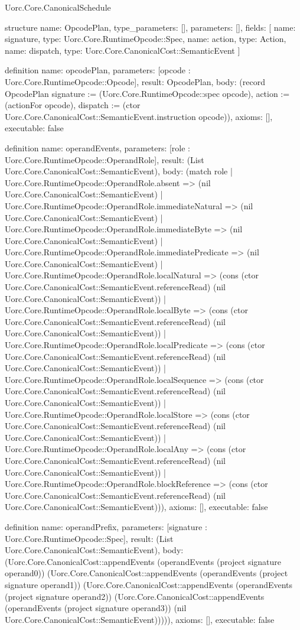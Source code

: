 \begin{lexlean}{Uorc.Core.CanonicalSchedule}
\begin{semanticmodule}
structure{
  name: OpcodePlan,
  type_parameters: [],
  parameters: [],
  fields: [
    {name: signature, type: Uorc.Core.RuntimeOpcode::Spec},
    {name: action, type: Action},
    {name: dispatch, type: Uorc.Core.CanonicalCost::SemanticEvent}
  ]
}

definition{
  name: opcodePlan,
  parameters: [opcode : Uorc.Core.RuntimeOpcode::Opcode],
  result: OpcodePlan,
  body: (record OpcodePlan {signature := (Uorc.Core.RuntimeOpcode::spec opcode), action := (actionFor opcode), dispatch := (ctor Uorc.Core.CanonicalCost::SemanticEvent.instruction opcode)}),
  axioms: [],
  executable: false
}

definition{
  name: operandEvents,
  parameters: [role : Uorc.Core.RuntimeOpcode::OperandRole],
  result: (List Uorc.Core.CanonicalCost::SemanticEvent),
  body: (match role
    | Uorc.Core.RuntimeOpcode::OperandRole.absent => (nil Uorc.Core.CanonicalCost::SemanticEvent)
    | Uorc.Core.RuntimeOpcode::OperandRole.immediateNatural => (nil Uorc.Core.CanonicalCost::SemanticEvent)
    | Uorc.Core.RuntimeOpcode::OperandRole.immediateByte => (nil Uorc.Core.CanonicalCost::SemanticEvent)
    | Uorc.Core.RuntimeOpcode::OperandRole.immediatePredicate => (nil Uorc.Core.CanonicalCost::SemanticEvent)
    | Uorc.Core.RuntimeOpcode::OperandRole.localNatural => (cons (ctor Uorc.Core.CanonicalCost::SemanticEvent.referenceRead) (nil Uorc.Core.CanonicalCost::SemanticEvent))
    | Uorc.Core.RuntimeOpcode::OperandRole.localByte => (cons (ctor Uorc.Core.CanonicalCost::SemanticEvent.referenceRead) (nil Uorc.Core.CanonicalCost::SemanticEvent))
    | Uorc.Core.RuntimeOpcode::OperandRole.localPredicate => (cons (ctor Uorc.Core.CanonicalCost::SemanticEvent.referenceRead) (nil Uorc.Core.CanonicalCost::SemanticEvent))
    | Uorc.Core.RuntimeOpcode::OperandRole.localSequence => (cons (ctor Uorc.Core.CanonicalCost::SemanticEvent.referenceRead) (nil Uorc.Core.CanonicalCost::SemanticEvent))
    | Uorc.Core.RuntimeOpcode::OperandRole.localStore => (cons (ctor Uorc.Core.CanonicalCost::SemanticEvent.referenceRead) (nil Uorc.Core.CanonicalCost::SemanticEvent))
    | Uorc.Core.RuntimeOpcode::OperandRole.localAny => (cons (ctor Uorc.Core.CanonicalCost::SemanticEvent.referenceRead) (nil Uorc.Core.CanonicalCost::SemanticEvent))
    | Uorc.Core.RuntimeOpcode::OperandRole.blockReference => (cons (ctor Uorc.Core.CanonicalCost::SemanticEvent.referenceRead) (nil Uorc.Core.CanonicalCost::SemanticEvent))),
  axioms: [],
  executable: false
}

definition{
  name: operandPrefix,
  parameters: [signature : Uorc.Core.RuntimeOpcode::Spec],
  result: (List Uorc.Core.CanonicalCost::SemanticEvent),
  body: (Uorc.Core.CanonicalCost::appendEvents (operandEvents (project signature operand0)) (Uorc.Core.CanonicalCost::appendEvents (operandEvents (project signature operand1)) (Uorc.Core.CanonicalCost::appendEvents (operandEvents (project signature operand2)) (Uorc.Core.CanonicalCost::appendEvents (operandEvents (project signature operand3)) (nil Uorc.Core.CanonicalCost::SemanticEvent))))),
  axioms: [],
  executable: false
}


\end{semanticmodule}
\end{lexlean}
